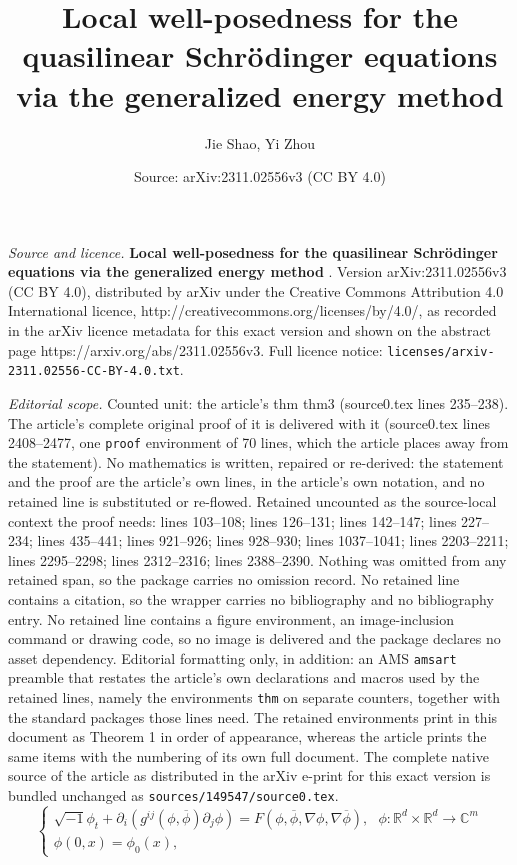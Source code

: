 \documentclass[10pt,a4paper]{amsart}
\title{{\bf \Large Local well-posedness for the quasilinear Schr\"odinger equations via the generalized energy method }}
\author{Jie Shao, Yi Zhou}
\date{Source: arXiv:2311.02556v3 (CC BY 4.0)}
\begin{document}
\maketitle

\noindent\emph{Source and licence.} {\bf \Large Local well-posedness for the quasilinear Schr\"odinger equations via the generalized energy method }. Version arXiv:2311.02556v3 (CC BY 4.0), distributed by arXiv under the Creative Commons Attribution 4.0 International licence, http://creativecommons.org/licenses/by/4.0/, as recorded in the arXiv licence metadata for this exact version and shown on the abstract page https://arxiv.org/abs/2311.02556v3. Full licence notice: \texttt{licenses/arxiv-2311.02556-CC-BY-4.0.txt}.\par\smallskip

\noindent\textit{Editorial scope.} Counted unit: the article's thm thm3 (source0.tex lines 235--238). The article's complete original proof of it is delivered with it (source0.tex lines 2408--2477, one \texttt{proof} environment of 70 lines, which the article places away from the statement). No mathematics is written, repaired or re-derived: the statement and the proof are the article's own lines, in the article's own notation, and no retained line is substituted or re-flowed.  Retained uncounted as the source-local context the proof needs: lines 103--108; lines 126--131; lines 142--147; lines 227--234; lines 435--441; lines 921--926; lines 928--930; lines 1037--1041; lines 2203--2211; lines 2295--2298; lines 2312--2316; lines 2388--2390.  Nothing was omitted from any retained span, so the package carries no omission record.  No retained line contains a citation, so the wrapper carries no bibliography and no bibliography entry.  No retained line contains a figure environment, an image-inclusion command or drawing code, so no image is delivered and the package declares no asset dependency.  Editorial formatting only, in addition: an AMS \texttt{amsart} preamble that restates the article's own declarations and macros used by the retained lines, namely the environments \texttt{thm} on separate counters, together with the standard packages those lines need.  The retained environments print in this document as Theorem 1 in order of appearance, whereas the article prints the same items with the numbering of its own full document.  The complete native source of the article as distributed in the arXiv e-print for this exact version is bundled unchanged as \texttt{sources/149547/source0.tex}.
	\begin{equation}	 \label{qNLS}
	\begin{cases}
			\sqrt{-1}\phi_t+\partial_i\left( g^{ij}\left(\phi,\overline{\phi}\right) \partial_j \phi\right)=F\left(\phi,\overline{\phi},\nabla\phi, \nabla \overline{\phi}\right),~~~\phi: \mathbb{R}^d \times \mathbb{R}^d\rightarrow \mathbb{C}^m\\
			\phi(0,x)=\phi_0(x),
	\end{cases}
	\end{equation}
\end{document}
